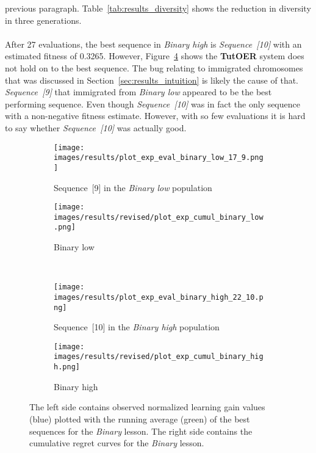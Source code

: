 previous paragraph. Table~\ref{tab:results_diversity} shows the reduction in
diversity in three generations.\\\\
\noindent
After 27 evaluations, the best sequence in \emph{Binary high} is
\emph{Sequence~[10]} with an estimated fitness of 0.3265. However,
Figure~\ref{fig:exp_cumul_binary_high} shows the \textbf{TutOER} system does
not hold on to the best sequence. The bug relating to immigrated chromosomes
that was discussed in Section~\ref{sec:results_intuition} is likely the cause
of that. \emph{Sequence~[9]} that immigrated from \emph{Binary low} appeared to
be the best performing sequence. Even though \emph{Sequence~[10]} was in fact
the only sequence with a non-negative fitness estimate. However, with so few
evaluations it is hard to say whether \emph{Sequence~[10]} was actually good.

\begin{figure}[ht]
	\centering
	\begin{subfigure}{0.6\linewidth}
	\centering
	\texttt{[image: images/results/plot\_exp\_eval\_binary\_low\_17\_9.png]}
	\caption{Sequence~[9] in the \emph{Binary low} population}
	\label{fig:exp_eval_binary_low_17}
	\end{subfigure}
	\hfill
	\begin{subfigure}{0.39\linewidth}
	\centering
	\texttt{[image: images/results/revised/plot\_exp\_cumul\_binary\_low.png]}
	\caption{Binary low}
	\label{fig:exp_cumul_binary_low}
	\end{subfigure}\\
	\begin{subfigure}{0.6\linewidth}
	\centering
	\texttt{[image: images/results/plot\_exp\_eval\_binary\_high\_22\_10.png]}
	\caption{Sequence~[10] in the \emph{Binary high} population}
	\label{fig:exp_eval_binary_high_10}
	\end{subfigure}
	\hfill
	\begin{subfigure}{0.39\linewidth}
	\centering
	\texttt{[image: images/results/revised/plot\_exp\_cumul\_binary\_high.png]}
	\caption{Binary high}
	\label{fig:exp_cumul_binary_high}
	\end{subfigure}
	\caption[Evaluations of best sequences and cumulative regret in
	Binary]{The left side contains observed normalized learning gain values
		(blue) plotted with the running average (green) of the best sequences
		for the \emph{Binary} lesson. The right side contains the cumulative
		regret curves for the \emph{Binary} lesson.}
	\label{fig:exp_eval_binary}
\end{figure}

